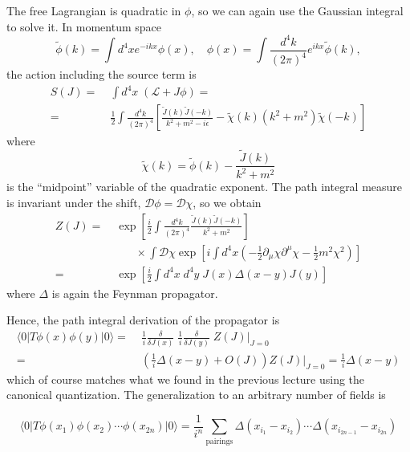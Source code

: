 \documentclass[12pt]{article}
\begin{document}
The free Lagrangian is quadratic in $\phi$, so we can again use the
Gaussian integral to solve it. In momentum space
\begin{equation}
  \tilde\phi(k) = \int d^4x e^{-ikx} \phi(x)
  ,\quad
  \phi(x) = \int \frac{d^4k}{(2\pi)^4} e^{ikx} \tilde\phi(k),
\end{equation}
the action including the source term is
\begin{equation}
  \begin{split}
    S(J) =&\; \int d^4x \; (\mathcal{L} + J\phi) =
    \\ =&\;
    \frac{1}{2}
    \int \frac{d^4k}{(2\pi)^4} \left[
      \frac{\tilde{J}(k) \tilde{J}(-k)}{k^2+m^2-i\epsilon}
      - \tilde\chi(k) (k^2+m^2) \tilde{\chi}(-k)
    \right]
  \end{split}
\end{equation}
where
\begin{equation}
  \tilde\chi(k) = \tilde\phi(k) - \frac{\tilde{J}(k)}{k^2 + m^2}
\end{equation}
is the ``midpoint'' variable of the quadratic exponent. The path
integral measure is invariant under the shift, $\mathcal{D}\phi =
\mathcal{D}\chi$, so we obtain
\begin{equation}
  \begin{split}
    Z(J) =&\;
    \exp\left[\frac{i}{2} \int \frac{d^4k}{(2\pi)^4} 
      \frac{\tilde{J}(k)\tilde{J}(-k)}{k^2 + m^2}
    \right]
    \\ &\qquad
    \times
    \int \mathcal{D}\chi 
    \exp\left[ i\int d^4x 
      \left(-\tfrac{1}{2} \partial_\mu \chi \partial^\mu \chi
      - \tfrac{1}{2} m^2\chi^2\right)
    \right]
    \\ =&\;
    \exp\left[
      \frac{i}{2} \int d^4x \; d^4y \;
      J(x) \Delta(x-y) J(y) 
    \right]
  \end{split}
\end{equation}
where $\Delta$ is again the Feynman propagator.

Hence, the path integral derivation of the propagator is 
\begin{equation}
  \begin{split}
  \langle 0|T \phi(x) \phi(y) |0\rangle 
  =&\;
  \tfrac{1}{i} \frac{\delta}{\delta J(x)} \;
  \tfrac{1}{i} \frac{\delta}{\delta J(y)} \;
  Z(J)|_{J=0} 
  \\ =&\;
  \left( \tfrac{1}{i} \Delta(x-y) + O(J) \right) Z(J) |_{J=0} =
  \tfrac{1}{i} \Delta(x-y)
  \end{split}  
\end{equation}
which of course matches what we found in the previous lecture using
the canonical quantization. The generalization to an arbitrary number
of fields is
\begin{theorem}
  \begin{equation}
    \langle 0 | T \phi(x_1) \phi(x_2) \cdots \phi(x_{2n}) |0\rangle  =
    \frac{1}{i^n} \sum_\text{pairings}
    \Delta(x_{i_1} - x_{i_2})
    \cdots
    \Delta(x_{i_{2n-1}} - x_{i_{2n}})
  \end{equation}
\end{theorem}
\end{document}
